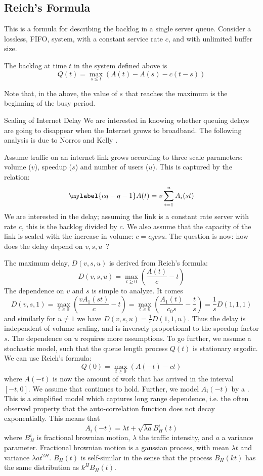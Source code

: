 \subsection{Reich's Formula}
This is a formula for describing
the backlog in a single server queue. Consider a
lossless, FIFO, system, with a constant service
rate $c$, and with unlimited buffer size.
\begin{shadethm}[\nt{Reich}]
The backlog at time $t$ in the system defined
above is
$$
Q(t)=\max_{s \leq t}\left(A(t)-A(s)-c
(t-s)\right)
$$
\end{shadethm}
Note that, in the above, the value of $s$ that reaches the maximum is the beginning of the busy period.
\begin{ex}{Scaling of
Internet Delay} We are interested in knowing
whether queuing delays are going to disappear
when the Internet grows to broadband. The
following analysis is due to Norros
\cite{norros1994storage} and Kelly
\cite{kelly2000models}.

Assume traffic on an internet link grows according to three scale parameters: volume ($v$),
speedup ($s$) and number of users ($u$). This is captured by the relation:
\begin{equation}\mylabel{eq-q-1}
  A(t)=v\sum_{i=1}^{u}A_i(st)
\end{equation}
We are interested in the delay; assuming the link is a constant rate server with rate $c$, this
is the backlog divided by $c$. We also assume that the capacity of the link is scaled with the
increase in volume: $c=c_0 vsu$. The question is now: how does the delay depend on $v,s, u$~?

The maximum delay, $D(v,s,u)$ is derived from Reich's formula:
$$D(v,s,u)=\max_{t\geq 0}\left(\frac{A(t)}{c}-t\right)
$$
The dependence on $v$ and $s$ is simple to
analyze. It comes
$$
D(v,s,1)=\max_{t\geq 0}\left(\frac{vA_1(st)}{c}-t\right)=\max_{t\geq 0}\left(\frac{A_1(t)}{c_0 s
}-\frac{t}{s}\right)=\frac{1}{s}D(1,1,1)
$$and similarly for $u \neq 1$ we have $D(v,s,u)=\frac{1}{s}D(1,1,u)$.
Thus the delay is independent of volume scaling, and is inversely proportional to the speedup
factor $s$. The dependence on $u$ requires more assumptions. To go further, we assume a
stochastic model, such that the queue length process $Q(t)$ is stationary ergodic. We can use
Reich's formula:
$$
Q(0)=\max_{t\geq 0}\left(A(-t)-ct\right)
$$
where $A(-t)$ is now the amount of work that has arrived in the
interval $[-t,0]$. We assume that  continues to
hold. Further, we model $A_i(-t)$ by a  \cite{norros1994storage}. This is a simplified model
which captures long range dependence, i.e. the often observed
property that the auto-correlation function does not decay
exponentially. This means that
$$
A_i(-t)=\lambda t + \sqrt{\lambda a}B_H^i(t)
$$
where $B_H^i$ is fractional brownian motion,
$\lambda$ the traffic intensity, and $a$ a
variance parameter. Fractional brownian motion is
a gaussian process, with mean $\lambda t$ and
variance $\lambda a t^{2H}$. $B_H(t)$ is
self-similar in the sense that the process
$B_H(kt)$ has the same distribution as $k^H
B_H(t)$.


\end{ex}
